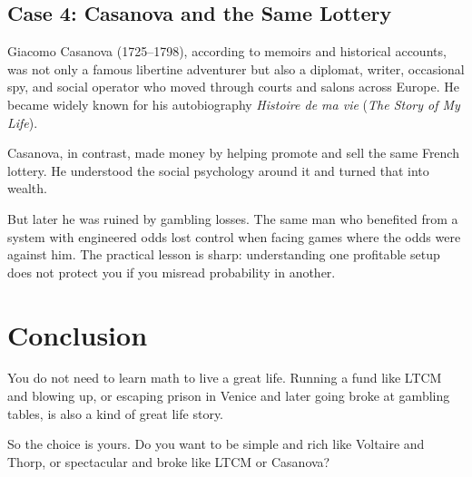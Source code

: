 \subsection*{Case 4: Casanova and the Same Lottery}
Giacomo Casanova (1725--1798), according to memoirs and historical accounts,
was not only a famous libertine adventurer but also a diplomat, writer,
occasional spy, and social operator who moved through courts and salons across
Europe.  He became widely known for his autobiography \emph{Histoire de ma vie}
(\emph{The Story of My Life}).

Casanova, in contrast, made money by helping promote and sell the same French
lottery.  He understood the social psychology around it and turned that into
wealth.

But later he was ruined by gambling losses.  The same man who benefited from a
system with engineered odds lost control when facing games where the odds were
against him.  The practical lesson is sharp: understanding one profitable setup
does not protect you if you misread probability in another.

\section{Conclusion}
You do not need to learn math to live a great life.  Running a fund like LTCM
and blowing up, or escaping prison in Venice and later going broke at gambling
tables, is also a kind of great life story.

So the choice is yours.  Do you want to be simple and rich like Voltaire and
Thorp, or spectacular and broke like LTCM or Casanova?